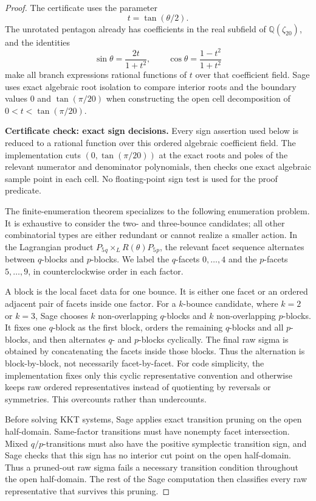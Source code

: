 \begin{proof}
The certificate uses the parameter
\[
  t=\tan(\theta/2).
\]
The unrotated pentagon already has coefficients in the real subfield of
\(\mathbb{Q}(\zeta_{20})\), and the identities
\[
  \sin\theta=\frac{2t}{1+t^2},
  \qquad
  \cos\theta=\frac{1-t^2}{1+t^2}
\]
make all branch expressions rational functions of \(t\) over that coefficient
field. Sage uses exact algebraic root isolation to compare interior roots and
the boundary values \(0\) and \(\tan(\pi/20)\) when constructing the open
cell decomposition of \(0<t<\tan(\pi/20)\).

\begin{certificatecheck}
\noindent\textbf{Certificate check: exact sign decisions.}
Every sign assertion used below is reduced to a rational function over this
ordered algebraic coefficient field. The implementation cuts
\((0,\tan(\pi/20))\) at the exact roots and poles of the relevant numerator and
denominator polynomials, then checks one exact algebraic sample point in each
cell. No floating-point sign test is used for the proof predicate.
\end{certificatecheck}

The finite-enumeration theorem specializes to the following enumeration
problem.
It is exhaustive to consider the two- and three-bounce candidates; all other
combinatorial types are either redundant or cannot realize a smaller action.
In the Lagrangian product
\(P_5{}_q\times_L R(\theta)P_5{}_p\), the relevant facet sequence alternates
between \(q\)-blocks and \(p\)-blocks. We label the \(q\)-facets
\(0,\ldots,4\) and the \(p\)-facets \(5,\ldots,9\), in counterclockwise order
in each factor.

A block is the local facet data for one bounce. It is either one facet or an
ordered adjacent pair of facets inside one factor. For a \(k\)-bounce
candidate, where \(k=2\) or \(k=3\), Sage chooses
\(k\) non-overlapping \(q\)-blocks and \(k\) non-overlapping \(p\)-blocks. It
fixes one \(q\)-block as the first block, orders the remaining \(q\)-blocks and
all \(p\)-blocks, and then alternates \(q\)- and \(p\)-blocks cyclically. The
final raw sigma is obtained by concatenating the facets inside those blocks.
Thus the alternation is block-by-block, not necessarily facet-by-facet.
For code simplicity, the implementation fixes only this cyclic representative
convention and otherwise keeps raw ordered representatives instead of
quotienting by reversals or symmetries. This overcounts rather than
undercounts.

Before solving KKT systems, Sage applies exact transition pruning on the open
half-domain. Same-factor transitions must have nonempty facet intersection.
Mixed \(q/p\)-transitions must also have the positive symplectic transition
sign, and Sage checks that this sign has no interior cut point on the open
half-domain. Thus a pruned-out raw sigma fails a necessary transition condition
throughout the open half-domain. The rest of the Sage computation then
classifies every raw representative that survives this pruning.


\end{proof}
